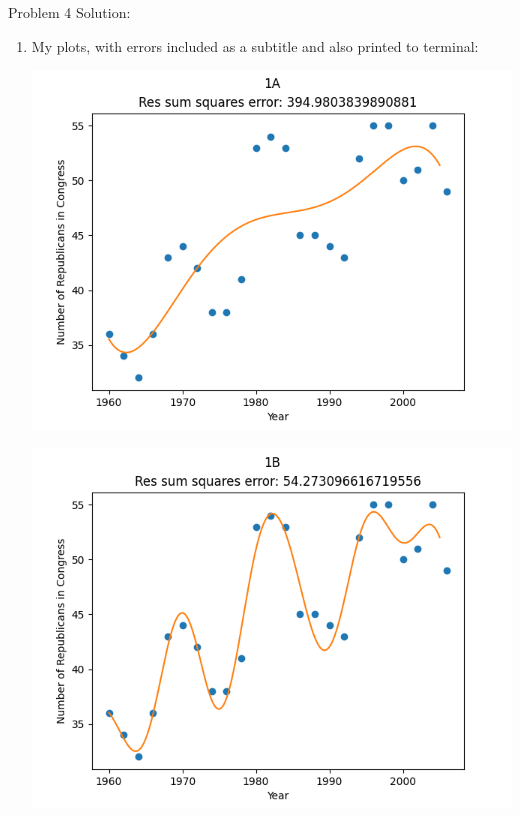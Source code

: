 \documentclass[submit]{harvardml}
\begin{document}
\newpage

Problem 4 Solution:

\begin{enumerate}
    \item My plots, with errors included as a subtitle and also printed to terminal:

    \includegraphics[scale=0.6]{plot-4-1a.png}

    \includegraphics[scale=0.6]{plot-4-1b.png}


\end{enumerate}
\end{document}
